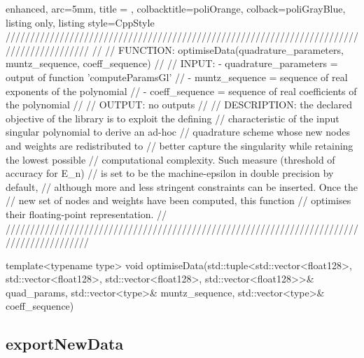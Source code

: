 \documentclass[a4paper, twosided]{book}
\begin{document}
\begin{tcblisting}{enhanced,
                   arc=5mm,
                   title = \color{black}{\large \ttfamily DatIo.cpp/optimiseData},
                   colbacktitle=poliOrange,
                   colback=poliGrayBlue,
                   listing only,
                   listing style=CppStyle}
/////////////////////////////////////////////////////////////////////////////////////////
//
//       FUNCTION: optimiseData(quadrature_parameters, muntz_sequence, coeff_sequence)
//                
//          INPUT: - quadrature_parameters = output of function 'computeParamsGl'
//                 - muntz_sequence = sequence of real exponents of the polynomial
//                 - coeff_sequence = sequence of real coefficients of the polynomial
//
//         OUTPUT: no outputs
//
//    DESCRIPTION: the declared objective of the library is to exploit the defining
//                 characteristic of the input singular polynomial to derive an ad-hoc
//                 quadrature scheme whose new nodes and weights are redistributed to
//                 better capture the singularity while retaining the lowest possible
//                 computational complexity. Such measure (threshold of accuracy for E_n)
//                 is set to be the machine-epsilon in double precision by default,
//                 although more and less stringent constraints can be inserted. Once the
//                 new set of nodes and weights have been computed, this function
//                 optimises their floating-point representation.
//
/////////////////////////////////////////////////////////////////////////////////////////

template<typename type>
void optimiseData(std::tuple<std::vector<float128>, std::vector<float128>, std::vector<float128>, std::vector<float128>>& quad_params, std::vector<type>& muntz_sequence, std::vector<type>& coeff_sequence)
\end{tcblisting}

\subsection[exportNewData]{\changefont exportNewData}\label{SubSec4.2.4}
\end{document}
